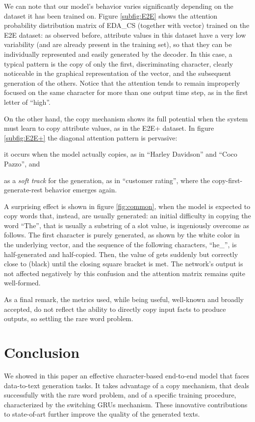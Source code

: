 \documentclass[runningheads, envcountsame, a4paper]{llncs}
\begin{document}
We can note that our model's behavior varies significantly depending on the dataset it has been trained on. Figure \ref{subfig:E2E} shows the attention probability distribution matrix of EDA\_CS (together with  vector) trained on the E2E dataset: as observed before, attribute values in this dataset have a very low variability (and are already present in the training set), so that they can be individually represented and easily generated by the decoder. In this case, a typical pattern is the copy of only the first, discriminating character, clearly noticeable in the graphical representation of the  vector, and the subsequent generation of the others. Notice that the attention tends to remain improperly focused on the same character for more than one output time step, as in the first letter of ``high''.

On the other hand, the copy mechanism shows its full potential when the system must learn to copy attribute values, as in the E2E+ dataset. In figure \ref{subfig:E2E+} the diagonal attention pattern is pervasive:
\begin{enumerate*}[label={(\roman*)}]
    \item it occurs when the model actually copies, as in ``Harley Davidson'' and ``Coco Pazzo'', and 
    \item as a \textit{soft track} for the generation, as in ``customer rating'', where the copy-first-generate-rest behavior emerges again.
\end{enumerate*}

A surprising effect is shown in figure \ref{fig:common}, when the model is expected to copy words that, instead, are usually generated: an initial difficulty in copying the word ``The'', that is usually a substring of a slot value, is ingeniously overcome as follows. The first character is purely generated, as shown by the white color in the underlying vector, and the sequence of the following characters, ``he\_'', is half-generated and half-copied. Then, the value of  gets suddenly but correctly close to  (black) until the closing square bracket is met. The network's output is not affected negatively by this confusion and the attention matrix remains quite well-formed.

As a final remark, the metrics used, while being useful, well-known and broadly accepted, do not reflect the ability to directly copy input facts to produce outputs, so settling the rare word problem.

\section{Conclusion}
\label{sec:conclusion}
We showed in this paper an effective character-based end-to-end model that faces data-to-text generation tasks. It takes advantage of a copy mechanism, that deals successfully with the rare word problem, and of a specific training procedure, characterized by the switching GRUs mechanism. These innovative contributions to state-of-art further improve the quality of the generated texts.
\end{document}
